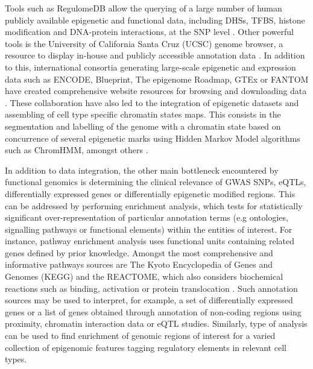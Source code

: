Tools such as RegulomeDB allow the querying of a large number of human publicly available epigenetic and functional data, including DHSs, TFBS, histone modification and DNA-protein interactions, at the SNP level \parencite{Boyle2012}. Other powerful tools is the University of California Santa Cruz (UCSC) genome browser, a resource to display in-house and publicly accessible annotation data \parencite{Kent2002}. In addition to this,  international consortia generating large-scale epigenetic and expression data such as ENCODE, Blueprint, The epigenome Roadmap, GTEx or FANTOM have created comprehensive website resources for browsing and downloading data \parencite{ENCODE2007,Londsdale2013, FANTOM2014,Adams2012 }. These collaboration have also led to the integration of epigenetic datasets and assembling of cell type specific chromatin states maps. This consists in the segmentation and labelling of the genome with a chromatin state based on concurrence of several epigenetic marks using Hidden Markov Model algorithms such as ChromHMM, amongst others \parencite{Ernst2010, Ernst2011,Hoffman2013, Kundaje2015 }. 

In addition to data integration, the other main bottleneck encountered by functional genomics is determining the clinical relevance of GWAS SNPs, eQTLs, differentially expressed genes or differentially epigenetic modified regions. This can be addressed by performing enrichment analysis, which tests for statistically significant over-representation of particular annotation terms (e.g ontologies, signalling pathways or functional elements) within the entities of interest. For instance, pathway enrichment analysis uses functional units containing related genes defined by prior knowledge. Amongst the most comprehensive and informative pathways sources are The Kyoto Encyclopedia of Genes and Genomes (KEGG) and the REACTOME, which also considers biochemical reactions such as binding, activation or protein translocation \parencite{Kanehisa2000, Fabregat2018}. Such annotation sources may be used to interpret, for example, a set of differentially expressed genes or a list of genes obtained through annotation of non-coding regions using proximity, chromatin interaction data or eQTL studies. Similarly, type of analysis can be used to find enrichment of genomic regions of interest for a varied collection of epigenomic features tagging regulatory elements in relevant cell types.%

